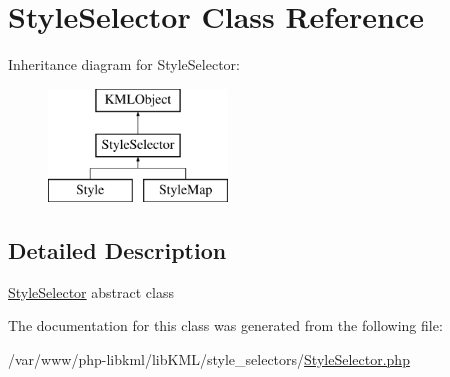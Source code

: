 \hypertarget{classStyleSelector}{
\section{StyleSelector Class Reference}
\label{df/df8/classStyleSelector}
}
Inheritance diagram for StyleSelector:\begin{figure}[H]
\begin{center}
\leavevmode
\includegraphics[height=3.000000cm]{df/df8/classStyleSelector}
\end{center}
\end{figure}


\subsection{Detailed Description}
\hyperlink{classStyleSelector}{StyleSelector} abstract class 

The documentation for this class was generated from the following file:\begin{DoxyCompactItemize}
\item 
/var/www/php-\/libkml/libKML/style\_\-selectors/\hyperlink{StyleSelector_8php}{StyleSelector.php}\end{DoxyCompactItemize}
